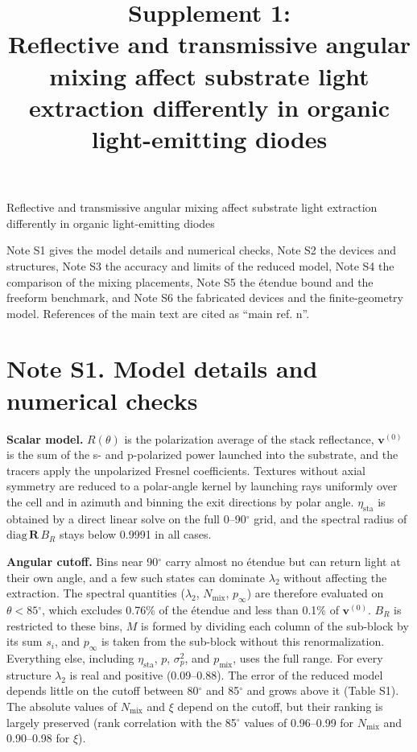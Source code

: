 \documentclass[10pt]{article}
\title{Supplement 1:\\Reflective and transmissive angular mixing affect substrate light extraction differently in organic light-emitting diodes}
\author{}
\date{}
\begin{document}
\maketitle
\sloppy


Reflective and transmissive angular mixing affect substrate light extraction differently in organic light-emitting diodes

Note S1 gives the model details and numerical checks, Note S2 the devices and structures, Note S3 the accuracy and limits of the reduced model, Note S4 the comparison of the mixing placements, Note S5 the étendue bound and the freeform benchmark, and Note S6 the fabricated devices and the finite-geometry model. References of the main text are cited as ``main ref. n''.

\section*{Note S1. Model details and numerical checks}

\textbf{Scalar model.} $R(\theta)$ is the polarization average of the stack reflectance, $\mathbf{v}^{(0)}$ is the sum of the s- and p-polarized power launched into the substrate, and the tracers apply the unpolarized Fresnel coefficients. Textures without axial symmetry are reduced to a polar-angle kernel by launching rays uniformly over the cell and in azimuth and binning the exit directions by polar angle. $\eta_{\mathrm{sta}}$ is obtained by a direct linear solve on the full 0–90\ensuremath{^\circ} grid, and the spectral radius of $\mathrm{diag}\,\mathbf{R}\,B_R$ stays below 0.9991 in all cases.

\textbf{Angular cutoff.} Bins near 90\ensuremath{^\circ} carry almost no étendue but can return light at their own angle, and a few such states can dominate $\lambda_2$ without affecting the extraction. The spectral quantities ($\lambda_2$, $N_{\mathrm{mix}}$, $p_\infty$) are therefore evaluated on $\theta < 85\ensuremath{^\circ}$, which excludes 0.76\% of the étendue and less than 0.1\% of $\mathbf{v}^{(0)}$. $B_R$ is restricted to these bins, $M$ is formed by dividing each column of the sub-block by its sum $s_i$, and $p_\infty$ is taken from the sub-block without this renormalization. Everything else, including $\eta_{\mathrm{sta}}$, $p$, $\sigma_p^2$, and $p_{\mathrm{mix}}$, uses the full range. For every structure $\lambda_2$ is real and positive (0.09–0.88). The error of the reduced model depends little on the cutoff between 80\ensuremath{^\circ} and 85\ensuremath{^\circ} and grows above it (Table S1). The absolute values of $N_{\mathrm{mix}}$ and $\xi$ depend on the cutoff, but their ranking is largely preserved (rank correlation with the 85\ensuremath{^\circ} values of 0.96–0.99 for $N_{\mathrm{mix}}$ and 0.90–0.98 for $\xi$).
\end{document}
